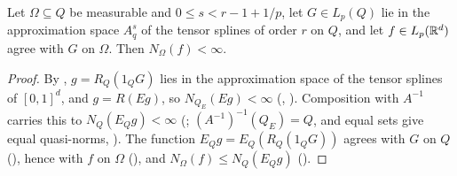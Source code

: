 \begin{proposition}
\label{prop:domain-splines-finite}
\leanok
{}
Let $\Omega \subseteq Q$ be measurable and $0 \leq s < r - 1 + 1/p$, let $G \in L_p(Q)$ lie in
the approximation space $A^s_q$ of the tensor splines of order $r$ on $Q$, and let
$f \in L_p(\mathbb{R}^d)$ agree with $G$ on $\Omega$. Then $N_\Omega(f) < \infty$.
\end{proposition}

\begin{proof}
\leanok
{}
By , $g = R_Q(1_Q G)$ lies in the approximation space of the
tensor splines of $[0, 1]^d$, and $g = R(E g)$, so $N_{Q_E}(E g) < \infty$
(, ). Composition with
$A^{-1}$ carries this to
$N_Q(E_Q g) < \infty$ (; $(A^{-1})^{-1}(Q_E) = Q$, and equal sets give
equal quasi-norms, ). The function $E_Q g = E_Q(R_Q(1_Q G))$ agrees with
$G$ on $Q$ (), hence with $f$ on $\Omega$
(), and $N_\Omega(f) \leq N_Q(E_Q g)$
().
\end{proof}

